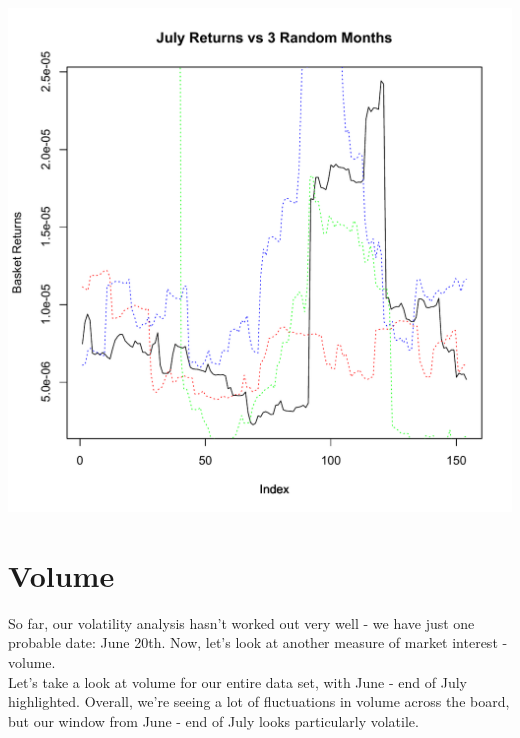 \documentclass[11pt]{amsart}
\begin{document}
 \includegraphics[scale=0.5]{july_3_months.pdf} \\

\newpage
\section{Volume}

So far, our volatility analysis hasn't worked out very well - we have just one probable date: June 20th. Now, let's look at another measure of market interest - volume.  \\

Let's take a look at volume for our entire data set, with June - end of July highlighted. Overall, we're seeing a lot of fluctuations in volume across the board, but our window from June - end of July looks particularly volatile. 
\end{document}
